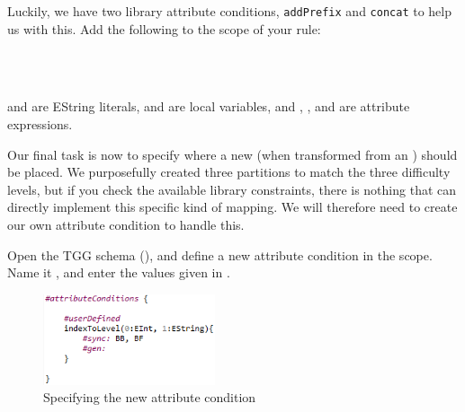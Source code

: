 \begin{stepbystep}
\item Luckily, we have two library attribute conditions, \texttt{addPrefix} and \texttt{concat} to help us with this.
Add the following to the  scope of your rule:

\\  
\\

 and  are EString literals,  and
 are local variables, and , , and  are attribute expressions.

\item Our final task is now to specify where a new  (when transformed from an ) should be placed.  
We purposefully created three partitions to match the three difficulty levels, but if you check the available library constraints, there is nothing that can directly implement this specific kind of mapping. 
We will therefore need to create our own attribute condition to handle this.

\item Open the TGG schema (), and define a new attribute condition in the  scope. 
Name it , and enter the values given in .

\begin{figure}[htbp]
\begin{center}
  \includegraphics[width=0.45\textwidth]{../../org.moflon.doc.handbook.04_tripleGraphTransformations/4_rules/visRImages/ea_uniqueConstraint.PNG}
  \caption{Specifying the new attribute condition }
  \label{ea:create_new_constraint}
\end{center}
\end{figure}
\FloatBarrier


\end{stepbystep}
